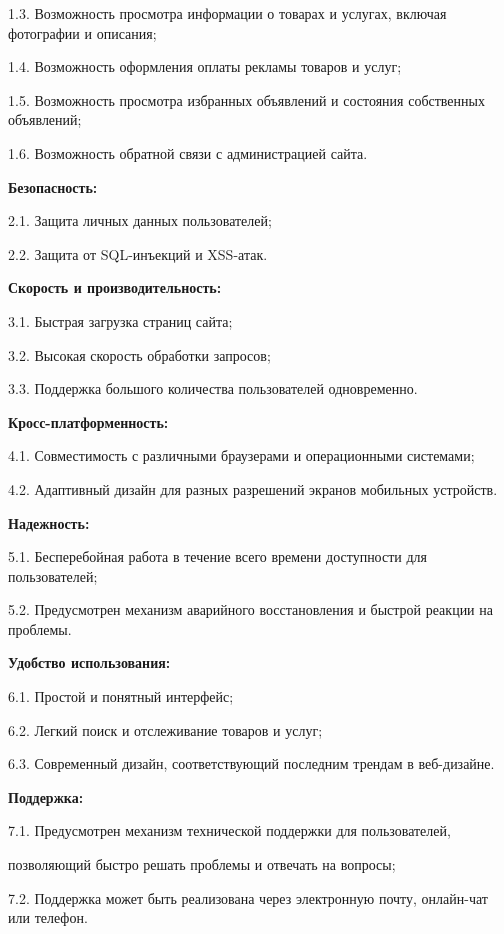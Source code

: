     1.3. Возможность просмотра информации о товарах и услугах, включая фотографии и описания;
    
    1.4. Возможность оформления оплаты рекламы товаров и услуг;
    
    1.5. Возможность просмотра избранных объявлений и состояния собственных объявлений;
    
    1.6. Возможность обратной связи с администрацией сайта.

    \textbf{Безопасность:}
    
    2.1. Защита личных данных пользователей;
    
    2.2. Защита от SQL-инъекций и XSS-атак.

    \textbf{Скорость и производительность:}
    
    3.1. Быстрая загрузка страниц сайта;
    
    3.2. Высокая скорость обработки запросов;
    
    3.3. Поддержка большого количества пользователей одновременно.

    \textbf{Кросс-платформенность:}
    
    4.1. Совместимость с различными браузерами и операционными системами;
    
    4.2. Адаптивный дизайн для разных разрешений экранов мобильных устройств.

    \textbf{Надежность:}
    
    5.1. Бесперебойная работа в течение всего времени доступности для пользователей;
    
    5.2. Предусмотрен механизм аварийного восстановления и быстрой реакции на проблемы.

    \textbf{Удобство использования:}
    
    6.1. Простой и понятный интерфейс;
    
    6.2. Легкий поиск и отслеживание товаров и услуг;
    
    6.3. Современный дизайн, соответствующий последним трендам в веб-дизайне.

    \textbf{Поддержка:}
    
    7.1. Предусмотрен механизм технической поддержки для пользователей, 

    позволяющий быстро решать проблемы и отвечать на вопросы;
    
    7.2. Поддержка может быть реализована через электронную почту, онлайн-чат или телефон.









